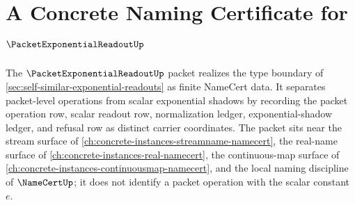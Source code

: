 \chapter{A Concrete Naming Certificate for $\PacketExponentialReadoutUp$}
\label{ch:concrete-instances-packet-exponential-readout-namecert}

The $\PacketExponentialReadoutUp$ packet realizes the type boundary of \autoref{sec:self-similar-exponential-readouts} as finite NameCert data. It separates packet-level operations from scalar exponential shadows by recording the packet operation row, scalar readout row, normalization ledger, exponential-shadow ledger, and refusal row as distinct carrier coordinates. The packet sits near the stream surface of \autoref{ch:concrete-instances-streamname-namecert}, the real-name surface of \autoref{ch:concrete-instances-real-namecert}, the continuous-map surface of \autoref{ch:concrete-instances-continuousmap-namecert}, and the local naming discipline of $\NameCertUp$; it does not identify a packet operation with the scalar constant $e$.

